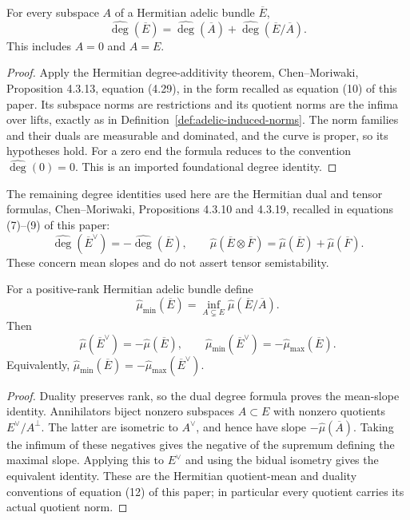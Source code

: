 \begin{lemma}
\label{lem:degree-exact-sequence}
\leanok
For every subspace $A$ of a Hermitian adelic bundle $\overline E$,
\[
 \widehat{\deg}(\overline E)
   =\widehat{\deg}(\overline A)+\widehat{\deg}(\overline E/\overline A).
\]
This includes $A=0$ and $A=E$.
\end{lemma}
\begin{proof}
Apply the Hermitian degree-additivity theorem, Chen--Moriwaki,
Proposition 4.3.13, equation (4.29), in the form recalled as equation (10)
of this paper. Its subspace norms are restrictions and its quotient
norms are the infima over lifts, exactly as in
Definition~\ref{def:adelic-induced-norms}. The norm families and their
duals are measurable and dominated, and the curve is proper, so its
hypotheses hold. For a zero end the formula reduces to the convention
$\widehat{\deg}(0)=0$. This is an imported foundational degree identity.
\end{proof}

The remaining degree identities used here are the Hermitian dual and tensor
formulas, Chen--Moriwaki, Propositions 4.3.10 and 4.3.19, recalled in
equations (7)--(9) of this paper:
\[
 \widehat{\deg}(\overline E^\vee)=-\widehat{\deg}(\overline E),\qquad
 \widehat\mu(\overline E\otimes\overline F)
     =\widehat\mu(\overline E)+\widehat\mu(\overline F).
\]
These concern mean slopes and do not assert tensor semistability.

\begin{lemma}
\label{lem:slope-duality}
\leanok
For a positive-rank Hermitian adelic bundle define
\[
 \widehat\mu_{\min}(\overline E)
   =\inf_{A\subsetneq E}\widehat\mu(\overline E/\overline A).
\]
Then
\[
 \widehat\mu(\overline E^\vee)=-\widehat\mu(\overline E),\qquad
 \widehat\mu_{\min}(\overline E^\vee)
       =-\widehat\mu_{\max}(\overline E).
\]
Equivalently, $\widehat\mu_{\min}(\overline E)
=-\widehat\mu_{\max}(\overline E^\vee)$.
\end{lemma}
\begin{proof}
Duality preserves rank, so the dual degree formula proves the mean-slope
identity. Annihilators biject nonzero subspaces $A\subset E$ with
nonzero quotients $E^\vee/A^\perp$. The latter are isometric to
$A^\vee$, and hence have slope $-\widehat\mu(\overline A)$.
Taking the infimum of these negatives gives the negative of the
supremum defining the maximal slope. Applying this to $E^\vee$ and
using the bidual isometry gives the equivalent identity. These are the
Hermitian quotient-mean and duality conventions of equation (12) of
this paper; in particular every quotient carries its actual quotient norm.
\end{proof}

